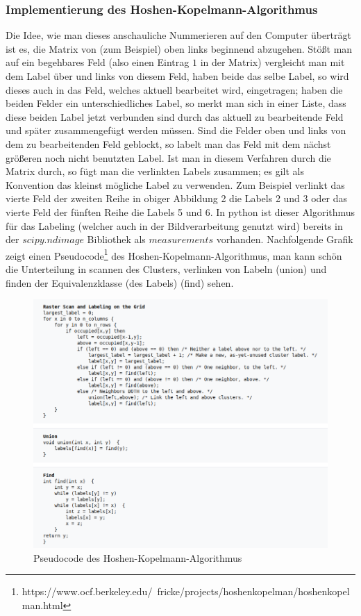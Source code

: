 \documentclass[a4paper, 12pt]{scrartcl}
\begin{document}
\subsubsection{Implementierung des Hoshen-Kopelmann-Algorithmus}
Die Idee, wie man dieses anschauliche Nummerieren auf den Computer überträgt ist es, die Matrix von (zum Beispiel) oben links beginnend abzugehen. Stößt man auf ein begehbares Feld (also einen Eintrag $1$ in der Matrix) vergleicht man mit dem Label über und links von diesem Feld, haben beide das selbe Label, so wird dieses auch in das Feld, welches aktuell bearbeitet wird, eingetragen; haben die beiden Felder ein unterschiedliches Label, so merkt man sich in einer Liste, dass diese beiden Label jetzt verbunden sind durch das aktuell zu bearbeitende Feld und später zusammengefügt werden müssen. Sind die Felder oben und links von dem zu bearbeitenden Feld geblockt, so labelt man das Feld mit dem nächst größeren noch nicht benutzten Label. Ist man in diesem Verfahren durch die Matrix durch, so fügt man die verlinkten Labels zusammen; es gilt als Konvention das kleinst mögliche Label zu verwenden. Zum Beispiel verlinkt das vierte Feld der zweiten Reihe in obiger Abbildung 2 die Labels 2 und 3 oder das vierte Feld der fünften Reihe die Labels 5 und 6.
\noindent In python ist dieser Algorithmus für das Labeling (welcher auch in der Bildverarbeitung genutzt wird) bereits in der $scipy.ndimage$ Bibliothek als $measurements$ vorhanden. Nachfolgende Grafik zeigt einen Pseudocode\footnote[3]{https://www.ocf.berkeley.edu/~fricke/projects/hoshenkopelman/hoshenkopelman.html} des Hoshen-Kopelmann-Algorithmus, man kann schön die Unterteilung in scannen des Clusters, verlinken von Labeln (union) und finden der Equivalenzklasse (des Labels) (find) sehen.\newpage

\begin{figure}
	\centering
	\includegraphics[scale=0.7]{HSK_pseudocode.png}
	\caption{Pseudocode des Hoshen-Kopelmann-Algorithmus}
\end{figure}
\end{document}

